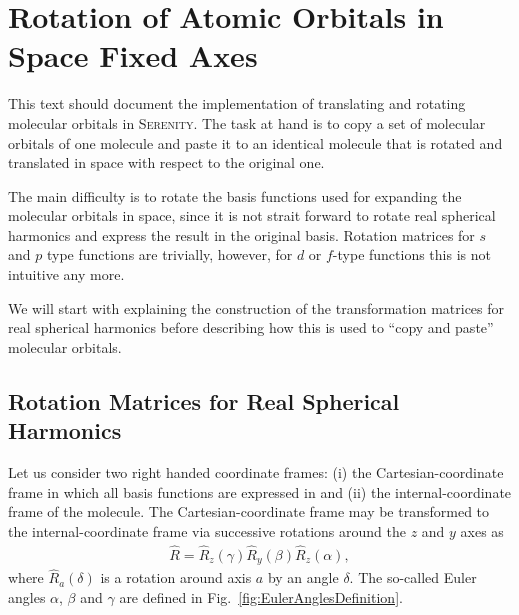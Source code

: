 \section{Rotation of Atomic Orbitals in Space Fixed Axes}
This text should document the implementation of translating and rotating molecular orbitals in
\textsc{Serenity}. The task at hand is to copy a set of molecular orbitals of one molecule and paste
it to an identical molecule that is rotated and translated in space with respect to the original
one.

The main difficulty is to rotate the basis functions used for expanding the molecular orbitals in space,
since it is not strait forward to rotate real spherical harmonics and express the result in the original
basis. Rotation matrices for $s$ and $p$ type functions are trivially, however,
for $d$ or $f$-type functions this is not intuitive any more.

We will start with explaining the construction of the transformation matrices for real spherical harmonics
before describing how this is used to ``copy and paste'' molecular orbitals.

\subsection{Rotation Matrices for Real Spherical Harmonics}

Let us consider two right handed coordinate frames: (i) the Cartesian-coordinate frame in which all basis
functions are expressed in and (ii) the internal-coordinate frame of the molecule. The Cartesian-coordinate
frame may be transformed to the internal-coordinate frame via successive rotations around the $z$ and $y$
axes as
\begin{align}
  \hat{R} = \hat{R}_z(\gamma)\hat{R}_y(\beta)\hat{R}_z(\alpha),
\end{align}
where $\hat{R}_a(\delta)$ is a rotation around axis $a$ by an angle $\delta$. The so-called Euler angles $\alpha$, $\beta$ and $\gamma$ are defined in Fig.~\ref{fig:EulerAnglesDefinition}.

